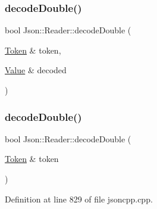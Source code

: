 \hypertarget{class_json_1_1_reader_a5e4a66be7c413bca86078f14df5eb802}{}\label{class_json_1_1_reader_a5e4a66be7c413bca86078f14df5eb802} 
\subsubsection{\texorpdfstring{decode\+Double()}{decodeDouble()}\hspace{0.1cm}{\footnotesize\ttfamily [2/4]}}
{\footnotesize\ttfamily bool Json\+::\+Reader\+::decode\+Double (\begin{DoxyParamCaption}\item[{\hyperlink{class_json_1_1_reader_1_1_token}{Token} \&}]{token,  }\item[{\hyperlink{class_json_1_1_value}{Value} \&}]{decoded }\end{DoxyParamCaption})\hspace{0.3cm}{\ttfamily [private]}}

\hypertarget{class_json_1_1_reader_a2420bbb7fd6d5d3e7e2fea894dd8f70f}{}\label{class_json_1_1_reader_a2420bbb7fd6d5d3e7e2fea894dd8f70f} 
\subsubsection{\texorpdfstring{decode\+Double()}{decodeDouble()}\hspace{0.1cm}{\footnotesize\ttfamily [3/4]}}
{\footnotesize\ttfamily bool Json\+::\+Reader\+::decode\+Double (\begin{DoxyParamCaption}\item[{\hyperlink{class_json_1_1_reader_1_1_token}{Token} \&}]{token }\end{DoxyParamCaption})\hspace{0.3cm}{\ttfamily [private]}}



Definition at line 829 of file jsoncpp.\+cpp.

\hypertarget{class_json_1_1_reader_a5e4a66be7c413bca86078f14df5eb802}{}\label{class_json_1_1_reader_a5e4a66be7c413bca86078f14df5eb802} 
